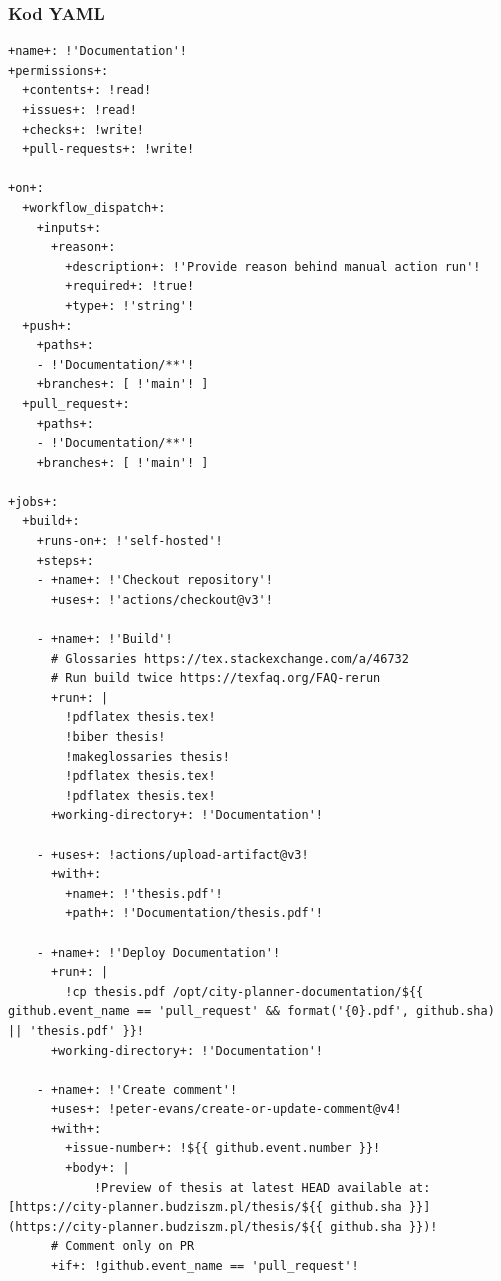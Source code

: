 \subsubsection{Kod YAML}
\begin{lstlisting}[style=yaml-colored]
+name+: !'Documentation'!
+permissions+:
  +contents+: !read!
  +issues+: !read!
  +checks+: !write!
  +pull-requests+: !write!

+on+:
  +workflow_dispatch+:
    +inputs+:
      +reason+:
        +description+: !'Provide reason behind manual action run'!
        +required+: !true!
        +type+: !'string'!
  +push+:
    +paths+:
    - !'Documentation/**'!
    +branches+: [ !'main'! ]
  +pull_request+:
    +paths+:
    - !'Documentation/**'!
    +branches+: [ !'main'! ]

+jobs+:
  +build+:
    +runs-on+: !'self-hosted'!
    +steps+:
    - +name+: !'Checkout repository'!
      +uses+: !'actions/checkout@v3'!

    - +name+: !'Build'!
      # Glossaries https://tex.stackexchange.com/a/46732
      # Run build twice https://texfaq.org/FAQ-rerun
      +run+: |
        !pdflatex thesis.tex!
        !biber thesis!
        !makeglossaries thesis!
        !pdflatex thesis.tex!
        !pdflatex thesis.tex!
      +working-directory+: !'Documentation'!

    - +uses+: !actions/upload-artifact@v3!
      +with+:
        +name+: !'thesis.pdf'!
        +path+: !'Documentation/thesis.pdf'!

    - +name+: !'Deploy Documentation'!
      +run+: |
        !cp thesis.pdf /opt/city-planner-documentation/${{ github.event_name == 'pull_request' && format('{0}.pdf', github.sha) || 'thesis.pdf' }}!
      +working-directory+: !'Documentation'!

    - +name+: !'Create comment'!
      +uses+: !peter-evans/create-or-update-comment@v4!
      +with+:
        +issue-number+: !${{ github.event.number }}!
        +body+: |
            !Preview of thesis at latest HEAD available at: [https://city-planner.budziszm.pl/thesis/${{ github.sha }}](https://city-planner.budziszm.pl/thesis/${{ github.sha }})!
      # Comment only on PR
      +if+: !github.event_name == 'pull_request'!
\end{lstlisting}

